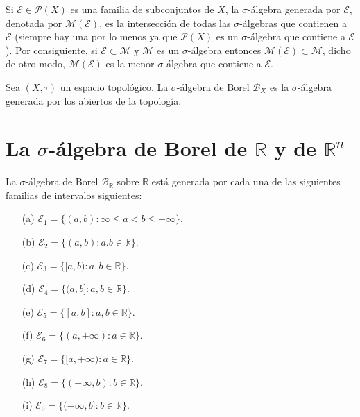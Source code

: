 \begin{defi}
Si $\mathcal{E} \in \mathcal{P}(X)$ es una familia de subconjuntos de $X$, la $\sigma$-álgebra generada por $\mathcal{E}$, denotada por $\mathcal{M(E)}$, es la intersección de todas las $\sigma$-álgebras que contienen a $\mathcal{E}$ (siempre hay una por lo menos ya que $\mathcal{P}(X)$ es un $\sigma$-álgebra que contiene a $\mathcal{E}$).
\newline
Por consiguiente, si $\mathcal{E} \subset \mathcal{M}$ y $\mathcal{M}$ es un $\sigma$-álgebra entonces $\mathcal{M(E)} \subset \mathcal{M}$, dicho de otro modo, $\mathcal{M(E)}$ es la menor $\sigma$-álgebra que contiene a $\mathcal{E}$.
\end{defi}
\begin{defi}
Sea $(X, \tau)$ un espacio topológico. La $\sigma$-álgebra de Borel $\mathcal{B}_X$ es la $\sigma$-álgebra generada por los abiertos de la topología.
\end{defi}

\newpage
\section{La $\sigma$-álgebra de Borel de $\mathbb{R}$ y de $\mathbb{R}^n$}
\begin{prop}
La $\sigma$-álgebra de Borel $\mathcal{B}_{\mathbb{R}}$ sobre $\mathbb{R}$ está generada por cada una de las siguientes familias de intervalos siguientes:
\begin{enumerate}
    \item[(a)] $\mathcal{E}_1 = \{(a,b) : \infty \leq a < b \leq +\infty \}$.
    \item[(b)] $\mathcal{E}_2 = \{(a,b) : a.b \in \mathbb{R} \}$.
    \item[(c)] $\mathcal{E}_3 = \{[a,b) : a,b \in \mathbb{R} \}$.
    \item[(d)] $\mathcal{E}_4 = \{(a,b] : a,b \in \mathbb{R} \}$.
    \item[(e)] $\mathcal{E}_5 = \{[a,b] : a,b \in \mathbb{R} \}$.
    \item[(f)] $\mathcal{E}_6 = \{(a,+\infty) : a \in \mathbb{R} \}$.
    \item[(g)] $\mathcal{E}_7 = \{[a,+\infty) : a \in \mathbb{R} \}$.
    \item[(h)] $\mathcal{E}_8 = \{(-\infty,b) : b \in \mathbb{R} \}$.
    \item[(i)] $\mathcal{E}_9 = \{(-\infty,b] : b \in \mathbb{R} \}$.
\end{enumerate}
\end{prop}


